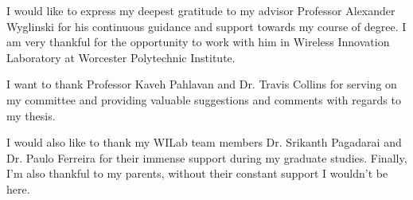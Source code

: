 I would like to express my deepest gratitude to my advisor Professor Alexander Wyglinski for his continuous guidance and support towards my course of degree. I am very thankful for the opportunity to work with him in Wireless Innovation Laboratory at Worcester Polytechnic Institute. 

I want to thank Professor Kaveh Pahlavan and Dr. Travis Collins for serving on my committee and providing valuable suggestions and comments with regards to my thesis. 

I would also like to thank my WILab team members Dr. Srikanth Pagadarai and Dr. Paulo Ferreira for their immense support during my graduate studies. Finally, I'm also thankful to my parents, without their constant support I wouldn't be here.
